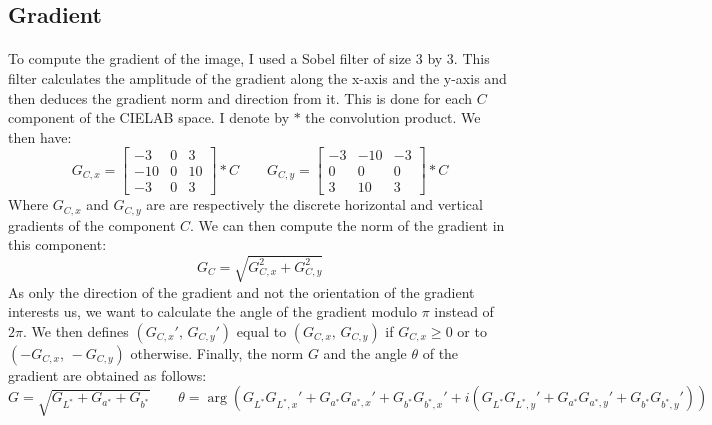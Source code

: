 \documentclass[11pt]{article}
\begin{document}
	\subsection{Gradient}
	
	\paragraph{}
	To compute the gradient of the image, I used a Sobel filter of size $3$ by $3$. This filter calculates the amplitude of the gradient along the x-axis and the y-axis and then deduces the gradient norm and direction from it. This is done for each $C$ component of the CIELAB space. I denote by $\ast$ the convolution product. We then have:
	$$ G_{C, x} = \begin{bmatrix} -3 & 0 & 3 \\ -10 & 0 & 10 \\ -3 & 0 & 3 \end{bmatrix} \ast C
		\qquad G_{C, y} = \begin{bmatrix} -3 & -10 & -3 \\ 0 & 0 & 0 \\ 3 & 10 & 3 \end{bmatrix} \ast C
	$$
	Where $G_{C, x}$ and $G_{C, y}$ are are respectively the discrete horizontal and vertical gradients of the component $C$. We can then compute the norm of the gradient in this component:
	$$ G_C = \sqrt{G_{C, x}^2 + G_{C, y}^2} $$
	As only the direction of the gradient and not the orientation of the gradient interests us, we want to calculate the angle of the gradient modulo $\pi$ instead of $2 \pi$. We then defines $(G_{C, x}', \, G_{C, y}')$ equal to $(G_{C, x}, \, G_{C, y})$ if $G_{C, x} \geqslant 0$ or to $(-G_{C, x}, \, -G_{C, y})$ otherwise. Finally, the norm $G$ and the angle $\theta$ of the gradient are obtained as follows:
	$$ G = \sqrt{G_{L^*} + G_{a^*} + G_{b^*}} \qquad \theta = \arg \left( G_{L^*} G_{L^*, x}' + G_{a^*} G_{a^*, x}' + G_{b^*} G_{b^*, x}' + i \left( G_{L^*} G_{L^*, y}' + G_{a^*} G_{a^*, y}' + G_{b^*} G_{b^*, y}' \right) \right)$$
	
\end{document}
